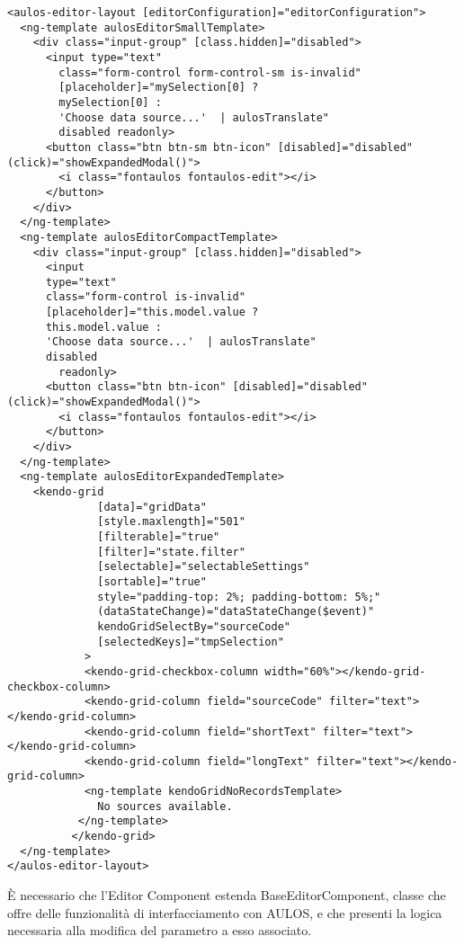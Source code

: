 \begin{lstlisting}[caption={source-editor.component.html},style=html]
<aulos-editor-layout [editorConfiguration]="editorConfiguration">
  <ng-template aulosEditorSmallTemplate>
    <div class="input-group" [class.hidden]="disabled">
      <input type="text" 
        class="form-control form-control-sm is-invalid"
        [placeholder]="mySelection[0] ? 
        mySelection[0] : 
        'Choose data source...'  | aulosTranslate" 
        disabled readonly>
      <button class="btn btn-sm btn-icon" [disabled]="disabled" (click)="showExpandedModal()">
        <i class="fontaulos fontaulos-edit"></i>
      </button>
    </div>
  </ng-template>
  <ng-template aulosEditorCompactTemplate>
    <div class="input-group" [class.hidden]="disabled">
      <input 
      type="text" 
      class="form-control is-invalid" 
      [placeholder]="this.model.value ? 
      this.model.value : 
      'Choose data source...'  | aulosTranslate" 
      disabled
        readonly>
      <button class="btn btn-icon" [disabled]="disabled" (click)="showExpandedModal()">
        <i class="fontaulos fontaulos-edit"></i>
      </button>
    </div>
  </ng-template>
  <ng-template aulosEditorExpandedTemplate>
    <kendo-grid
              [data]="gridData"
              [style.maxlength]="501"
              [filterable]="true"
              [filter]="state.filter"
              [selectable]="selectableSettings"
              [sortable]="true"
              style="padding-top: 2%; padding-bottom: 5%;"
              (dataStateChange)="dataStateChange($event)"
              kendoGridSelectBy="sourceCode"
              [selectedKeys]="tmpSelection"
            >
            <kendo-grid-checkbox-column width="60%"></kendo-grid-checkbox-column>
            <kendo-grid-column field="sourceCode" filter="text"></kendo-grid-column>
            <kendo-grid-column field="shortText" filter="text"></kendo-grid-column>
            <kendo-grid-column field="longText" filter="text"></kendo-grid-column>
            <ng-template kendoGridNoRecordsTemplate>
              No sources available.
           </ng-template>
          </kendo-grid>
  </ng-template>
</aulos-editor-layout>
\end{lstlisting}
È necessario che l'Editor Component estenda BaseEditorComponent, classe che offre delle funzionalità di interfacciamento con AULOS, e che presenti la logica necessaria alla modifica del parametro a esso associato.

